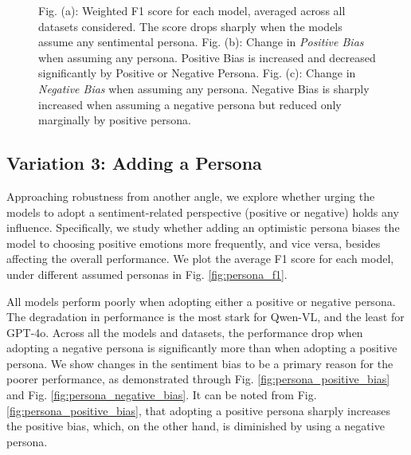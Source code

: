 \begin{figure*}
    \centering
    \hfill
    \hfill
    \caption{Fig. (a): Weighted F1 score for each model, averaged across all datasets considered. The score drops sharply when the models assume any sentimental persona.  Fig. (b): Change in \textit{Positive Bias} when assuming any persona. Positive Bias is increased and decreased significantly by Positive or Negative Persona. Fig. (c): Change in \textit{Negative Bias} when assuming any persona. Negative Bias is sharply increased when assuming a negative persona but reduced only marginally by positive persona.}
\end{figure*}


\subsection{Variation 3: Adding a Persona}
\label{sec:persona}

Approaching robustness from another angle, we explore whether urging the models to adopt a sentiment-related perspective (positive or negative) holds any influence. Specifically, we study whether adding an optimistic persona biases the model to choosing positive emotions more frequently, and vice versa, besides affecting the overall performance. We plot the average F1 score for each model, under different assumed personas in Fig. \ref{fig:persona_f1}. 

All models perform poorly when adopting either a positive or negative persona. The degradation in performance is the most stark for Qwen-VL, and the least for GPT-4o. Across all the models and datasets, the performance drop when adopting a negative persona is significantly more than when adopting a positive persona. We show changes in the sentiment bias to be a primary reason for the poorer performance, as demonstrated through Fig. \ref{fig:persona_positive_bias} and Fig. \ref{fig:persona_negative_bias}. It can be noted from Fig. \ref{fig:persona_positive_bias}, that adopting a positive persona sharply increases the positive bias, which, on the other hand, is diminished by using a negative persona. 

